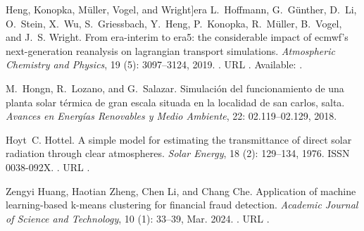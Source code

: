 \documentclass[letterpaper,12pt, twoside]{report}
\providecommand{\DIFdeltex}[1]{{\protect\color{red} \scriptsize #1}} %
\providecommand{\DIFdel}[1]{\texorpdfstring{\DIFdeltex{#1}}{}} %
\begin{document}
  Heng, Konopka, M\"uller, Vogel, and Wright]{era}
\DIFdel{L.~Hoffmann, G.~G\"unther, D.~Li, O.~Stein, X.~Wu, S.~Griessbach, Y.~Heng,
  P.~Konopka, R.~M\"uller, B.~Vogel, and J.~S. Wright.
}%
\DIFdel{From era-interim to era5: the considerable impact of ecmwf's
  next-generation reanalysis on lagrangian transport simulations.
}%
\DIFdel{\emph{Atmospheric Chemistry and Physics}, 19}%
\DIFdel{(5):}%
\DIFdel{3097--3124, 2019.
}%
\DIFdel{.
}%
\DIFdel{URL }%
\DIFdel{.
}%
\DIFdel{Available: }%
\DIFdel{.
}%

\DIFdel{M.~Hongn, R.~Lozano, and G.~Salazar.
}%
\DIFdel{Simulación del funcionamiento de una planta solar térmica de gran
  escala situada en la localidad de san carlos, salta.
}%
\DIFdel{\emph{Avances en Energías Renovables y Medio Ambiente}, 22:}%
\DIFdel{02.119--02.129, 2018.
}%

\DIFdel{Hoyt~C. Hottel.
}%
\DIFdel{A simple model for estimating the transmittance of direct solar
  radiation through clear atmospheres.
}%
\DIFdel{\emph{Solar Energy}, 18}%
\DIFdel{(2):}%
\DIFdel{129--134, 1976.
}%
\DIFdel{ISSN 0038-092X.
}%
\DIFdel{.
}%
\DIFdel{URL
  }%
\DIFdel{.
}%

\DIFdel{Zengyi Huang, Haotian Zheng, Chen Li, and Chang Che.
}%
\DIFdel{Application of machine learning-based k-means clustering for
  financial fraud detection.
}%
\DIFdel{\emph{Academic Journal of Science and Technology}, 10}%
\DIFdel{(1):}%
\DIFdel{33–39, Mar. 2024.
}%
\DIFdel{.
}%
\DIFdel{URL }%
\DIFdel{.
}%
\end{document}
